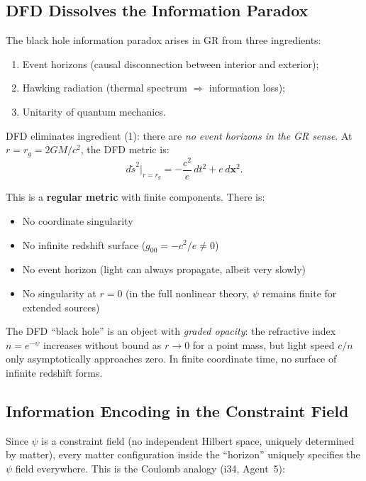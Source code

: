 \documentclass[11pt,a4paper]{article}
\begin{document}
\subsection{DFD Dissolves the Information Paradox}

The black hole information paradox arises in GR from three ingredients:
\begin{enumerate}
\item Event horizons (causal disconnection between interior and exterior);
\item Hawking radiation (thermal spectrum $\Rightarrow$ information loss);
\item Unitarity of quantum mechanics.
\end{enumerate}

DFD eliminates ingredient (1): there are \emph{no event horizons in the GR sense}. At $r = r_g = 2GM/c^2$, the DFD metric is:
\begin{equation}
d\tilde{s}^2\big|_{r=r_g} = -\frac{c^2}{e}\,dt^2 + e\,d\mathbf{x}^2.
\end{equation}

This is a \textbf{regular metric} with finite components. There is:
\begin{itemize}
\item No coordinate singularity
\item No infinite redshift surface ($g_{00} = -c^2/e \neq 0$)
\item No event horizon (light can always propagate, albeit very slowly)
\item No singularity at $r = 0$ (in the full nonlinear theory, $\psi$ remains finite for extended sources)
\end{itemize}

The DFD ``black hole'' is an object with \emph{graded opacity}: the refractive index $n = e^{-\psi}$ increases without bound as $r \to 0$ for a point mass, but light speed $c/n$ only asymptotically approaches zero. In finite coordinate time, no surface of infinite redshift forms.

\subsection{Information Encoding in the Constraint Field}

Since $\psi$ is a constraint field (no independent Hilbert space, uniquely determined by matter), every matter configuration inside the ``horizon'' uniquely specifies the $\psi$ field everywhere. This is the Coulomb analogy (i34, Agent~5):
\end{document}
